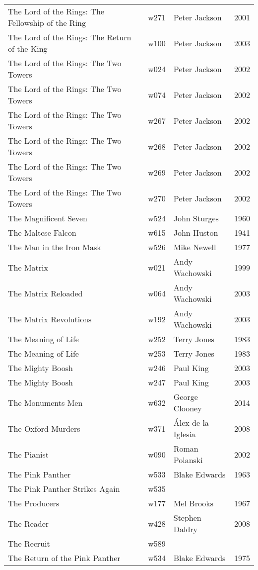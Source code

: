 \documentclass{article}
\begin{document}
\begin {center}
\begin{longtable}{p{10cm} l l l}
The Lord of the Rings: The Fellowship of the Ring & w271 & Peter Jackson & 2001 \\
The Lord of the Rings: The Return of the King & w100 & Peter Jackson & 2003 \\
The Lord of the Rings: The Two Towers & w024 & Peter Jackson & 2002 \\
The Lord of the Rings: The Two Towers & w074 & Peter Jackson & 2002 \\
The Lord of the Rings: The Two Towers & w267 & Peter Jackson & 2002 \\
The Lord of the Rings: The Two Towers & w268 & Peter Jackson & 2002 \\
The Lord of the Rings: The Two Towers & w269 & Peter Jackson & 2002 \\
The Lord of the Rings: The Two Towers & w270 & Peter Jackson & 2002 \\
The Magnificent Seven & w524 & John Sturges & 1960 \\
The Maltese Falcon & w615 & John Huston & 1941 \\
The Man in the Iron Mask & w526 & Mike Newell & 1977 \\
The Matrix & w021 & Andy Wachowski & 1999 \\
The Matrix Reloaded & w064 & Andy Wachowski & 2003 \\
The Matrix Revolutions & w192 & Andy Wachowski & 2003 \\
The Meaning of Life & w252 & Terry Jones & 1983 \\
The Meaning of Life & w253 & Terry Jones & 1983 \\
The Mighty Boosh & w246 & Paul King & 2003 \\
The Mighty Boosh & w247 & Paul King & 2003 \\
The Monuments Men & w632 & George Clooney & 2014 \\
The Oxford Murders & w371 & Álex de la Iglesia & 2008 \\
The Pianist & w090 & Roman Polanski & 2002 \\
The Pink Panther & w533 & Blake Edwards & 1963 \\
The Pink Panther Strikes Again & w535 &  &  \\
The Producers & w177 & Mel Brooks & 1967 \\
The Reader & w428 & Stephen Daldry & 2008 \\
The Recruit & w589 &  &  \\
The Return of the Pink Panther & w534 & Blake Edwards & 1975 \\

\end{longtable}
\end{center}
\end{document}
